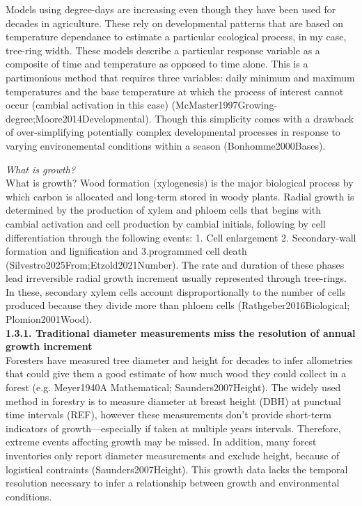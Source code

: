 \documentclass{article}
\begin{document}
Models using degree-days are increasing even though they have been used for decades in agriculture. These rely on developmental patterns that are based on temperature dependance to estimate a particular ecological process, in my case, tree-ring width. These models describe a particular response variable as a composite of time and temperature as opposed to time alone. This is a partimonious method that requires three variables: daily minimum and maximum temperatures and the base temperature at which the process of interest cannot occur (cambial activation in this case) (McMaster1997Growing-degree;Moore2014Developmental).  Though this simplicity comes with a drawback of over-simplifying potentially complex developmental processes in response to varying environemental conditions within a season (Bonhomme2000Bases).

\textit{What is growth?} \\ 
What is growth? Wood formation (xylogenesis) is the major biological process by which carbon is allocated and long-term stored in woody plants. Radial growth is determined by the production of xylem and phloem cells that begins with cambial activation and cell production by cambial initials, following by cell differentiation through the following events: 1. Cell enlargement 2. Secondary-wall formation and lignification and 3.programmed cell death (Silvestro2025From;Etzold2021Number). The rate and duration of these phases lead irreversible radial growth increment usually represented through tree-rings. In these, secondary xylem cells account disproportionally to the number of cells produced because they divide more than phloem cells (Rathgeber2016Biological; Plomion2001Wood). \\

\textbf{1.3.1. Traditional diameter measurements miss the resolution of annual growth increment} \\
Foresters have measured tree diameter and height for decades to infer allometries that could give them a good estimate of how much wood they could collect in a forest (e.g. Meyer1940A Mathematical; Saunders2007Height). The widely used method in forestry is to measure diameter at breast height (DBH) at punctual time intervals (REF), however these measurements don't provide short-term indicators of growth---especially if taken at multiple years intervals. Therefore, extreme events affecting growth may be missed. In addition, many forest inventories only report diameter measurements and exclude height, because of logistical contraints (Saunders2007Height). This growth data lacks the temporal resolution necessary to infer a relationship between growth and environmental conditions. 
\end{document}
